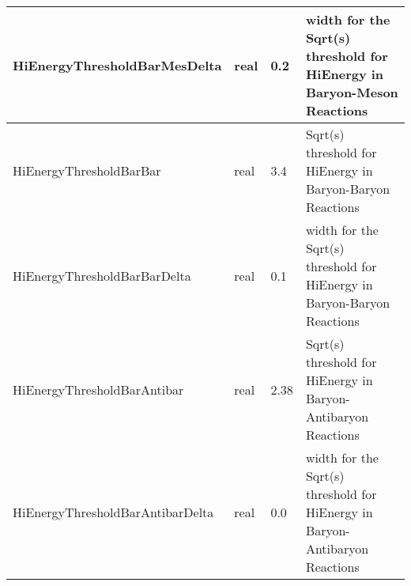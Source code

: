 \documentclass{article}
\begin{document}
\begin{longtable}{llll}
\midrule
HiEnergyThresholdBarMesDelta & \begin{minipage}[t]{2cm}real\end{minipage} & \begin{minipage}[t]{2cm}0.2\end{minipage} & \begin{minipage}[t]{12cm}width for the Sqrt(s) threshold for HiEnergy in Baryon-Meson Reactions\end{minipage}\\*
\midrule
HiEnergyThresholdBarBar & \begin{minipage}[t]{2cm}real\end{minipage} & \begin{minipage}[t]{2cm}3.4\end{minipage} & \begin{minipage}[t]{12cm}Sqrt(s) threshold for HiEnergy in Baryon-Baryon Reactions\end{minipage}\\*
\midrule
HiEnergyThresholdBarBarDelta & \begin{minipage}[t]{2cm}real\end{minipage} & \begin{minipage}[t]{2cm}0.1\end{minipage} & \begin{minipage}[t]{12cm}width for the Sqrt(s) threshold for HiEnergy in Baryon-Baryon Reactions\end{minipage}\\*
\midrule
HiEnergyThresholdBarAntibar & \begin{minipage}[t]{2cm}real\end{minipage} & \begin{minipage}[t]{2cm}2.38\end{minipage} & \begin{minipage}[t]{12cm}Sqrt(s) threshold for HiEnergy in Baryon-Antibaryon Reactions\end{minipage}\\*
\midrule
HiEnergyThresholdBarAntibarDelta & \begin{minipage}[t]{2cm}real\end{minipage} & \begin{minipage}[t]{2cm}0.0\end{minipage} & \begin{minipage}[t]{12cm}width for the Sqrt(s) threshold for HiEnergy in Baryon-Antibaryon Reactions\end{minipage}\\*
\midrule

\end{longtable}
\end{document}
